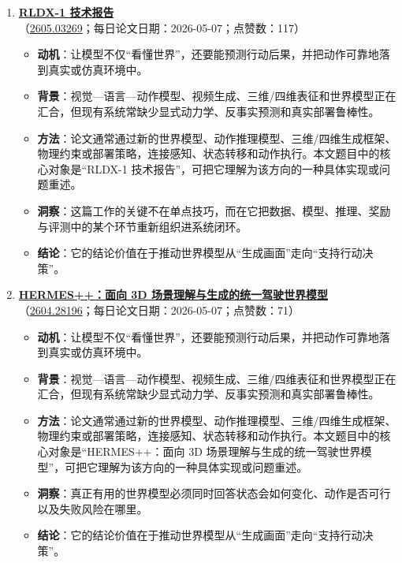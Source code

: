 \begin{enumerate}[leftmargin=1.5em]
\begin{itemize}[leftmargin=1.5em]
    \item \textbf{结论}：它的结论价值在于推动世界模型从“生成画面”走向“支持行动决策”。
  \end{itemize}
  \item \textbf{\href{https://huggingface.co/papers/2605.03269}{RLDX-1 技术报告}}（\href{https://arxiv.org/abs/2605.03269}{2605.03269}；每日论文日期：2026-05-07；点赞数：117）
  \begin{itemize}[leftmargin=1.5em]
    \item \textbf{动机}：让模型不仅“看懂世界”，还要能预测行动后果，并把动作可靠地落到真实或仿真环境中。
    \item \textbf{背景}：视觉—语言—动作模型、视频生成、三维/四维表征和世界模型正在汇合，但现有系统常缺少显式动力学、反事实预测和真实部署鲁棒性。
    \item \textbf{方法}：论文通常通过新的世界模型、动作推理模型、三维/四维生成框架、物理约束或部署策略，连接感知、状态转移和动作执行。本文题目中的核心对象是“RLDX-1 技术报告”，可把它理解为该方向的一种具体实现或问题重述。
    \item \textbf{洞察}：这篇工作的关键不在单点技巧，而在它把数据、模型、推理、奖励与评测中的某个环节重新组织进系统闭环。
    \item \textbf{结论}：它的结论价值在于推动世界模型从“生成画面”走向“支持行动决策”。
  \end{itemize}
  \item \textbf{\href{https://huggingface.co/papers/2604.28196}{HERMES++：面向 3D 场景理解与生成的统一驾驶世界模型}}（\href{https://arxiv.org/abs/2604.28196}{2604.28196}；每日论文日期：2026-05-07；点赞数：71）
  \begin{itemize}[leftmargin=1.5em]
    \item \textbf{动机}：让模型不仅“看懂世界”，还要能预测行动后果，并把动作可靠地落到真实或仿真环境中。
    \item \textbf{背景}：视觉—语言—动作模型、视频生成、三维/四维表征和世界模型正在汇合，但现有系统常缺少显式动力学、反事实预测和真实部署鲁棒性。
    \item \textbf{方法}：论文通常通过新的世界模型、动作推理模型、三维/四维生成框架、物理约束或部署策略，连接感知、状态转移和动作执行。本文题目中的核心对象是“HERMES++：面向 3D 场景理解与生成的统一驾驶世界模型”，可把它理解为该方向的一种具体实现或问题重述。
    \item \textbf{洞察}：真正有用的世界模型必须同时回答状态会如何变化、动作是否可行以及失败风险在哪里。
    \item \textbf{结论}：它的结论价值在于推动世界模型从“生成画面”走向“支持行动决策”。

\end{itemize}
\end{enumerate}
